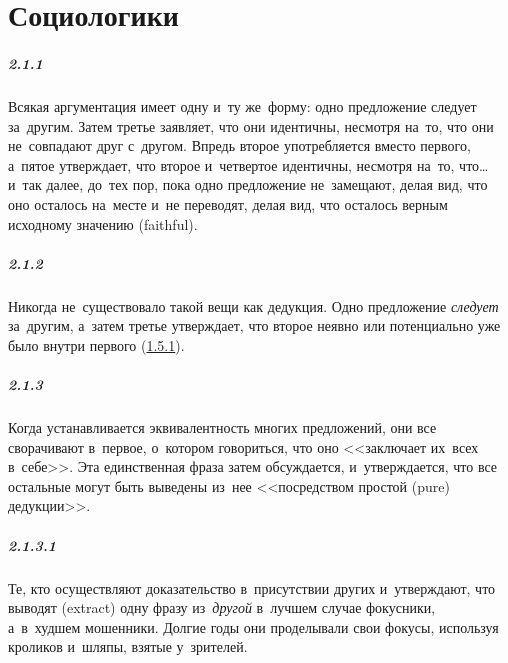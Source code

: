 \chapter{Социологики}

\paragraph{2.1.1}\hypertarget{par:2.1.1}{} Всякая аргументация имеет одну и~ту же~форму: одно предложение следует за~другим. Затем третье заявляет, что они идентичны, несмотря на~то, что они не~совпадают друг с~другом. Впредь второе употребляется вместо первого, а~пятое утверждает, что второе и~четвертое идентичны, несмотря на~то, что{\ldots} и~так далее, до~тех пор, пока одно предложение не~замещают, делая вид, что оно осталось на~месте и~не переводят, делая вид, что осталось верным исходному значению (faithful).

\paragraph{2.1.2}\hypertarget{par:2.1.2}{} Никогда не~существовало такой вещи как дедукция. Одно предложение {\itshape следует} за~другим, а~затем третье утверждает, что второе неявно или потенциально уже было внутри первого (\hyperlink{par:1.5.1}{1.5.1}).


\paragraph{2.1.3}\hypertarget{par:2.1.3}{} Когда устанавливается эквивалентность многих предложений, они все сворачивают в~первое, о~котором говориться, что оно <<заключает их~всех в~себе>>. Эта единственная фраза затем обсуждается, и~утверждается, что все остальные могут быть выведены из~нее <<посредством простой (pure) дедукции>>.

\paragraph{2.1.3.1}\hypertarget{par:2.1.3.1}{} Те, кто осуществляют доказательство в~присутствии других и~утверждают, что выводят (extract) одну фразу из~{\itshape другой} в~лучшем случае фокусники, а~в~худшем мошенники. Долгие годы они проделывали свои фокусы, используя кроликов и~шляпы, взятые у~зрителей.

